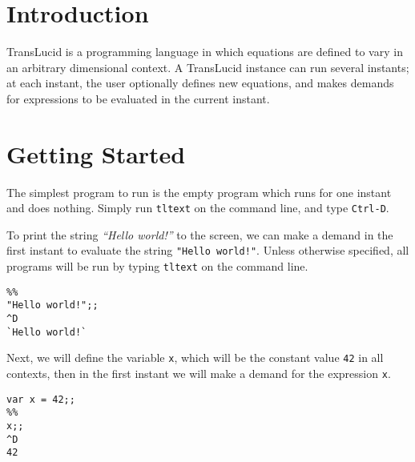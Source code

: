 \documentclass[a4paper]{article}
\begin{document}
\section{Introduction}

TransLucid is a programming language in which equations are defined to
vary in an arbitrary dimensional context. A TransLucid instance can run several
instants; at each instant, the user optionally defines new equations, and makes
demands for expressions to be evaluated in the current instant.

\section{Getting Started}

The simplest program to run is the empty program which runs for one instant and
does nothing. Simply run \verb|tltext| on the command line, and type 
\verb|Ctrl-D|.

To print the string \emph{``Hello world!''} to the screen, we can make a 
demand in the first instant to evaluate the string \verb|"Hello world!"|.
Unless otherwise specified, all programs will be run by typing \verb|tltext| on
the command line.
\begin{verbatim}
%%
"Hello world!";;
^D
`Hello world!`
\end{verbatim}

Next, we will define the variable \verb|x|, which will be the constant value
\verb|42| in all contexts, then in the first instant we will make a demand for
the expression \verb|x|.
\begin{verbatim}
var x = 42;;
%%
x;;
^D
42
\end{verbatim}
\end{document}
